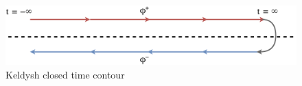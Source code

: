 \documentclass[a0,portrait]{a0poster}
\begin{document}
\begin{multicols}{3}
\end{multicols}
\begin{figure}[h]
    \includegraphics[width=\linewidth]{keldysh}
    \caption{Keldysh closed time contour}\label{fig:keldysh}
\end{figure}
\end{document}
